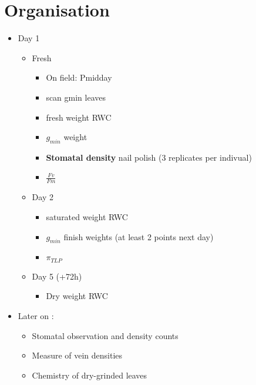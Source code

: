 \documentclass[
]{book}
\providecommand{\tightlist}{%
  \setlength{\itemsep}{0pt}\setlength{\parskip}{0pt}}
\begin{document}
\hypertarget{organisation}{%
\section{Organisation}\label{organisation}}

\begin{itemize}
\tightlist
\item
  Day 1

  \begin{itemize}
  \tightlist
  \item
    Fresh

    \begin{itemize}
    \tightlist
    \item
      On field: Pmidday
    \item
      scan gmin leaves
    \item
      fresh weight RWC
    \item
      \textbf{\(g_{min}\)} weight\\
    \item
      \textbf{Stomatal density} nail polish (3 replicates per indivual)
    \item
      \textbf{\(\frac{Fv}{Fm}\)}
    \end{itemize}
  \item
    Day 2

    \begin{itemize}
    \tightlist
    \item
      saturated weight RWC
    \item
      \textbf{\(g_{min}\)} finish weights (at least 2 points next day)
    \item
      \textbf{\(\pi_{TLP}\)}
    \end{itemize}
  \item
    Day 5 (+72h)

    \begin{itemize}
    \tightlist
    \item
      Dry weight RWC
    \end{itemize}
  \end{itemize}
\item
  Later on :

  \begin{itemize}
  \tightlist
  \item
    Stomatal observation and density counts
  \item
    Measure of vein densities
  \item
    Chemistry of dry-grinded leaves
  \end{itemize}
\end{itemize}
\end{document}
